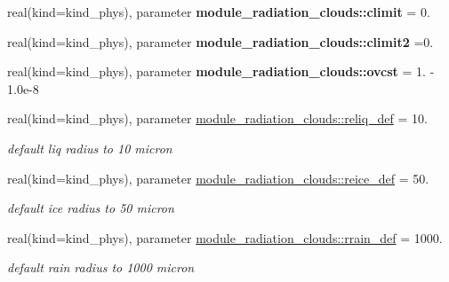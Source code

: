 \begin{DoxyCompactItemize}
real(kind=kind\+\_\+phys), parameter {\bfseries module\+\_\+radiation\+\_\+clouds\+::climit} = 0.
\item 
\mbox{\label{group__module__radiation__clouds_ga2f6f333d39f496f623036802fc05f209}} 
real(kind=kind\+\_\+phys), parameter {\bfseries module\+\_\+radiation\+\_\+clouds\+::climit2} =0.
\item 
\mbox{\label{group__module__radiation__clouds_ga5667082e13ef37593bdfcc152e3dd449}} 
real(kind=kind\+\_\+phys), parameter {\bfseries module\+\_\+radiation\+\_\+clouds\+::ovcst} = 1. -\/ 1.\+0e-\/8
\item 
\mbox{\label{group__module__radiation__clouds_ga1768a85f4d8af2ad40b62ae6e6667c1e}} 
real(kind=kind\+\_\+phys), parameter \hyperlink{group__module__radiation__clouds_ga1768a85f4d8af2ad40b62ae6e6667c1e}{module\+\_\+radiation\+\_\+clouds\+::reliq\+\_\+def} = 10.
\begin{DoxyCompactList}\small\item\em default liq radius to 10 micron \end{DoxyCompactList}\item 
\mbox{\label{group__module__radiation__clouds_ga721e0fb4a34774f5b61f567b9cad8e7b}} 
real(kind=kind\+\_\+phys), parameter \hyperlink{group__module__radiation__clouds_ga721e0fb4a34774f5b61f567b9cad8e7b}{module\+\_\+radiation\+\_\+clouds\+::reice\+\_\+def} = 50.
\begin{DoxyCompactList}\small\item\em default ice radius to 50 micron \end{DoxyCompactList}\item 
\mbox{\label{group__module__radiation__clouds_ga93fcaedae02c0f9c4de9f39061379d6b}} 
real(kind=kind\+\_\+phys), parameter \hyperlink{group__module__radiation__clouds_ga93fcaedae02c0f9c4de9f39061379d6b}{module\+\_\+radiation\+\_\+clouds\+::rrain\+\_\+def} = 1000.
\begin{DoxyCompactList}\small\item\em default rain radius to 1000 micron \end{DoxyCompactList}\item 

\end{DoxyCompactItemize}
